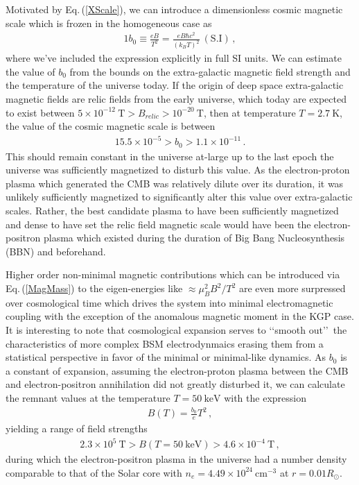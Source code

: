 \documentclass[Universe,article,submit,moreauthors,pdftex]{Definitions/mdpi}
\newcommand{\req}[1]{Eq.\,(\ref{#1})}
\begin{document}
Motivated by \req{XScale}, we can introduce a dimensionless cosmic magnetic scale which is frozen in the homogeneous case as
\begin{alignat}{1}
    \label{Bo} b_{0}\equiv\frac{eB}{T^{2}}=\frac{eB\hbar c^{2}}{(k_{B}T)^{2}}\ \mathrm{(S.I)}\,,
\end{alignat}
where we've included the expression explicitly in full SI units. We can estimate the value of $b_{0}$ from the bounds on the extra-galactic magnetic field strength and the temperature of the universe today.  If the origin of deep space extra-galactic magnetic fields are relic fields from the early universe, which today are expected to exist between $5\times10^{-12}\ \mathrm{T}>B_{relic}>10^{-20}\ \mathrm{T}$, then at temperature $T=2.7\ \mathrm{K}$, the value of the cosmic magnetic scale is between
\begin{alignat}{1}
    \label{BoScale} 5.5\times10^{-5}>b_{0}>1.1\times10^{-11}\,.
\end{alignat}
This should remain constant in the universe at-large up to the last epoch the universe was sufficiently magnetized to disturb this value. As the electron-proton plasma which generated the CMB was relatively dilute over its duration, it was unlikely sufficiently magnetized to significantly alter this value over extra-galactic scales. Rather, the best candidate plasma to have been sufficiently magnetized and dense to have set the relic field magnetic scale would have been the electron-positron plasma which existed during the duration of Big Bang Nucleosynthesis (BBN) and beforehand.

Higher order non-minimal magnetic contributions which can be introduced via \req{MagMass} to the eigen-energies like $\approx\mu_{B}^{2}B^{2}/T^{2}$ are even more surpressed over cosmological time which drives the system into minimal electromagnetic coupling with the exception of the anomalous magnetic moment in the KGP case. It is interesting to note that cosmological expansion serves to \lq\lq smooth out\rq\rq\ the characteristics of more complex BSM electrodynmaics erasing them from a statistical perspective in favor of the minimal or minimal-like dynamics. As $b_0$ is a constant of expansion, assuming the electron-proton plasma between the CMB and electron-positron annihilation did not greatly disturbed it, we can calculate the remnant values at the temperature $T=50\ \mathrm{keV}$ with the expression
\begin{align}
  \label{BBNFields} B(T)=\frac{b_{0}}{e}T^{2}\,,
\end{align}
yielding a range of field strengths
\begin{align}
  \label{BBNRange} 2.3\times10^{5}\ \mathrm{T}>B(T=50\ \mathrm{keV})>4.6\times10^{-4}\ \mathrm{T}\,,
\end{align}
during which the electron-positron plasma in the universe had a number density comparable to that of the Solar core with $n_{e}=4.49\times10^{24}\ \mathrm{cm}^{-3}$ at $r=0.01R_{\odot}$.
\end{document}
